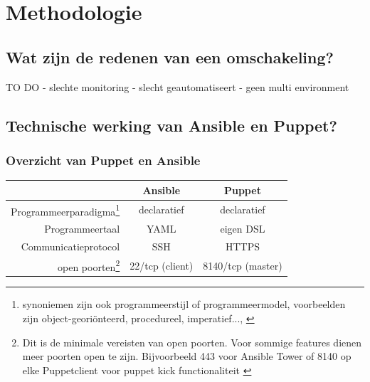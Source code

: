 
\chapter{Methodologie}
\label{ch:methodologie}


\section{Wat zijn de redenen van een omschakeling?}
\label{sec:methodologie-redenen-omschakeling}

TO DO
- slechte monitoring
- slecht geautomatiseert 
- geen multi environment

\section{Technische werking van Ansible en Puppet?}
\label{sec:methodologie-technische-verschillen}

\subsection{Overzicht van Puppet en Ansible}


\begin{tabular}{ r |c c }
& \textbf{Ansible} & \textbf{Puppet} \\
  \hline	  		
Programmeerparadigma\footnote{synoniemen zijn ook programmeerstijl of programmeermodel, voorbeelden zijn object-geori\"onteerd, procedureel, imperatief..., \autocite{journalofinformation} }  & declaratief & declaratief  \\
   \hline
 Programmeertaal & YAML & eigen DSL  \\
     \hline
   Communicatieprotocol & SSH & HTTPS \\
   \hline
   open poorten\footnote{Dit is de minimale vereisten van open poorten. Voor sommige features dienen meer poorten open te zijn. Bijvoorbeeld 443 voor Ansible Tower of 8140 op elke Puppetclient voor puppet kick functionaliteit \autocite{puppetkick} }  & 22/tcp (client) & 8140/tcp (master)\\
   
  

  \end{tabular}



